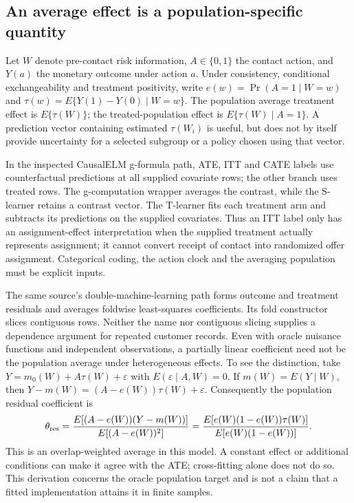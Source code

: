 \subsection{An average effect is a population-specific quantity}
\label{exec21:effects-target}

Let $W$ denote pre-contact risk information, $A\in\{0,1\}$ the contact action,
and $Y(a)$ the monetary outcome under action $a$. Under consistency,
conditional exchangeability and treatment positivity, write
$e(w)=\Pr(A=1\mid W=w)$ and
$\tau(w)=E\{Y(1)-Y(0)\mid W=w\}$. The population average treatment effect is
$E\{\tau(W)\}$; the treated-population effect is
$E\{\tau(W)\mid A=1\}$. A prediction vector containing estimated
$\tau(W_i)$ is useful, but does not by itself provide uncertainty for a
selected subgroup or a policy chosen using that vector.

In the inspected CausalELM g-formula path, ATE, ITT and CATE labels use
counterfactual predictions at all supplied covariate rows; the other branch
uses treated rows. The g-computation wrapper averages the contrast, while the
S-learner retains a contrast vector. The T-learner fits each treatment arm and
subtracts its predictions on the supplied covariates. Thus an ITT label only
has an assignment-effect interpretation when the supplied treatment actually
represents assignment; it cannot convert receipt of contact into randomized
offer assignment. Categorical coding, the action clock and the averaging
population must be explicit inputs. \cite{exec21_effects_causalelm}

The same source's double-machine-learning path forms outcome and treatment
residuals and averages foldwise least-squares coefficients. Its fold
constructor slices contiguous rows. Neither the name nor contiguous slicing
supplies a dependence argument for repeated customer records. Even with
oracle nuisance functions and independent observations, a partially linear
coefficient need not be the population average under heterogeneous effects.
To see the distinction, take
$Y=m_0(W)+A\tau(W)+\varepsilon$ with
$E(\varepsilon\mid A,W)=0$. If $m(W)=E(Y\mid W)$, then
$Y-m(W)=(A-e(W))\tau(W)+\varepsilon$. Consequently the population residual
coefficient is
\begin{equation}
\label{exec21:effects-residual}
 \theta_{\rm res}
 =\frac{E[(A-e(W))(Y-m(W))]}{E[(A-e(W))^2]}
 =\frac{E[e(W)(1-e(W))\tau(W)]}{E[e(W)(1-e(W))]}.
\end{equation}
This is an overlap-weighted average in this model. A constant effect or
additional conditions can make it agree with the ATE; cross-fitting alone
does not do so. This derivation concerns the oracle population target and is
not a claim that a fitted implementation attains it in finite samples.
\cite{exec21_effects_causalelm,exec21_effects_reference}


